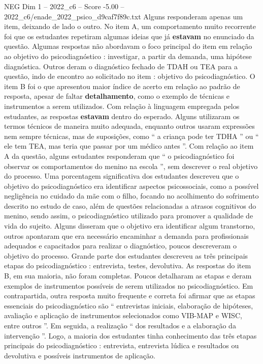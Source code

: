 \begin{textsample}{NEG Dim 1 – 2022\_c6 – Score -5.00 – 2022\_c6/enade\_2022\_psico\_d9caf7f89c.txt}
Alguns responderam apenas um item, deixando de lado o outro.
No item A, um comportamento muito recorrente foi que os estudantes repetiram algumas ideias que já \textbf{estavam} no enunciado da questão.
Algumas respostas não abordavam o foco principal do item em relação ao objetivo do psicodiagnóstico : investigar, a partir da demanda, uma hipótese diagnóstica.
Outros deram o diagnóstico fechado de TDAH ou TEA para a questão, indo de encontro ao solicitado no item : objetivo do psicodiagnóstico.
O item B foi o que apresentou maior índice de acerto em relação ao padrão de resposta, apesar de faltar \textbf{detalhamento}, como o exemplo de técnicas e instrumentos a serem utilizados.
Com relação à linguagem empregada pelos estudantes, as respostas \textbf{estavam} dentro do esperado.
Alguns utilizaram os termos técnicos de maneira muito adequada, enquanto outros usaram expressões nem sempre técnicas, mas de suposições, como “ a criança pode ter TDHA ” ou “ ele tem TEA, mas teria que passar por um médico antes ”.
Com relação ao item A da questão, alguns estudantes responderam que “ o psicodiagnóstico foi observar os comportamentos do menino na escola ”, sem descrever o real objetivo do processo.
Uma porcentagem significativa dos estudantes descreveu que o objetivo do psicodiagnóstico era identificar aspectos psicossociais, como a possível negligência no cuidado da mãe com o filho, focando no acolhimento do sofrimento descrito no estudo de caso, além de questões relacionadas a atrasos cognitivos do menino, sendo assim, o psicodiagnóstico utilizado para promover a qualidade de vida do sujeito.
Alguns disseram que o objetivo era identificar algum transtorno, outros apontaram que era necessário encaminhar a demanda para profissionais adequados e capacitados para realizar o diagnóstico, poucos descreveram o objetivo do processo.
Grande parte dos estudantes descreveu as três principais etapas do psicodiagnóstico : entrevista, testes, devolutiva.
As respostas do item B, em sua maioria, não foram completas.
Poucos detalharam as etapas e deram exemplos de instrumentos possíveis de serem utilizados no psicodiagnóstico.
Em contrapartida, outra resposta muito frequente e correta foi afirmar que as etapas essenciais do psicodiagnóstico são “ entrevistas iniciais, elaboração de hipóteses, avaliação e aplicação de instrumentos selecionados como VIB-MAP e WISC, entre outros ”.
Em seguida, a realização “ dos resultados e a elaboração da intervenção ”.
Logo, a maioria dos estudantes tinha conhecimento das três etapas principais do psicodiagnóstico : entrevista, entrevista lúdica e resultados ou devolutiva e possíveis instrumentos de aplicação.

\end{textsample}
